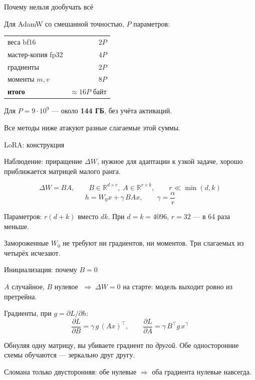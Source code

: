 \documentclass[11pt,aspectratio=169]{beamer}
\newcommand{\key}[1]{%
  \begin{center}\colorbox{boxbg}{\parbox{0.92\textwidth}{\vspace{2pt}#1\vspace{2pt}}}\end{center}}
\newcommand{\R}{\mathbb{R}}
\begin{document}
\begin{frame}{Почему нельзя дообучать всё}

Для AdamW со смешанной точностью, $P$ параметров:

\vspace{0.5em}
\begin{center}
\begin{tabular}{@{}lr@{}}
\toprule
веса bf16 & $2P$ \\
мастер-копия fp32 & $4P$ \\
градиенты & $2P$ \\
моменты $m,v$ & $8P$ \\
\midrule
\textbf{итого} & $\approx 16P$ байт \\
\bottomrule
\end{tabular}
\end{center}

\vspace{1em}
Для $P = 9\cdot 10^9$ — около \textbf{144 ГБ}, без учёта активаций.

\vspace{0.5em}
\key{Все методы ниже атакуют разные слагаемые этой суммы.}

\end{frame}

\begin{frame}{LoRA: конструкция}

Наблюдение: приращение $\Delta W$, нужное для адаптации к узкой задаче,
хорошо приближается матрицей малого ранга.

\[
\Delta W = BA, \qquad B \in \R^{d\times r},\; A \in \R^{r\times k},
\qquad r \ll \min(d,k)
\]
\[
h = W_0 x + \gamma\, BAx, \qquad \gamma = \frac{\alpha}{r}
\]

\vspace{0.5em}
Параметров: $r(d+k)$ вместо $dk$. При $d=k=4096$, $r=32$ — в 64 раза меньше.

\vspace{1em}
\key{Замороженные $W_0$ не требуют ни градиентов, ни моментов. Три
слагаемых из четырёх исчезают.}

\end{frame}

\begin{frame}{Инициализация: почему $B = 0$}

$A$ случайное, $B$ нулевое $\;\Rightarrow\; \Delta W = 0$ на старте:
модель выходит ровно из претрейна.

\vspace{0.8em}
Градиенты, при $g = \partial L/\partial h$:
\[
\frac{\partial L}{\partial B} = \gamma\, g\,(Ax)^\top,
\qquad
\frac{\partial L}{\partial A} = \gamma\, B^\top g\, x^\top
\]

\vspace{0.5em}
Обнуляя одну матрицу, вы убиваете градиент по \emph{другой}. Обе
односторонние схемы обучаются — зеркально друг другу.

\vspace{0.8em}
\key{Сломана только двусторонняя: обе нулевые $\Rightarrow$ оба
градиента нулевые навсегда.}

\end{frame}
\end{document}
